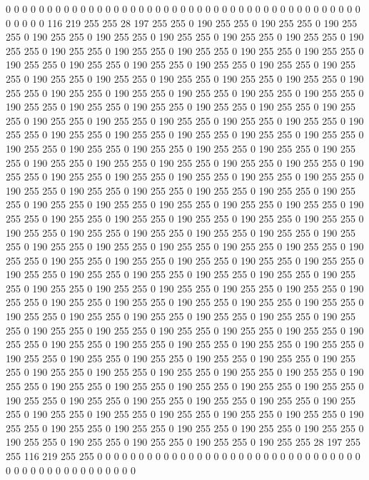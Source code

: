 0 0 0 0 0 0 0 0 0 0 0 0 0 0 0 0 0 0 0 0 0 0 0 0 0 0 0 0 0 0 0 0 0 0 0 0 0 0 0 0 0 0 0 0 0 0 0 0 116 219 255 255 28 197 255 255 0 190 255 255 0 190 255 255 0 190 255 255 0 190 255 255 0 190 255 255 0 190 255 255 0 190 255 255 0 190 255 255 0 190 255 255 0 190 255 255 0 190 255 255 0 190 255 255 0 190 255 255 0 190 255 255 0 190 255 255 0 190 255 255 0 190 255 255 0 190 255 255 0 190 255 255 0 190 255 255 0 190 255 255 0 190 255 255 0 190 255 255 0 190 255 255 0 190 255 255 0 190 255 255 0 190 255 255 0 190 255 255 0 190 255 255 0 190 255 255 0 190 255 255 0 190 255 255 0 190 255 255 0 190 255 255 0 190 255 255 0 190 255 255 
0 190 255 255 0 190 255 255 0 190 255 255 0 190 255 255 0 190 255 255 0 190 255 255 0 190 255 255 0 190 255 255 0 190 255 255 0 190 255 255 0 190 255 255 0 190 255 255 0 190 255 255 0 190 255 255 0 190 255 255 0 190 255 255 0 190 255 255 0 190 255 255 0 190 255 255 0 190 255 255 0 190 255 255 0 190 255 255 0 190 255 255 0 190 255 255 0 190 255 255 0 190 255 255 0 190 255 255 0 190 255 255 0 190 255 255 0 190 255 255 0 190 255 255 0 190 255 255 0 190 255 255 0 190 255 255 0 190 255 255 0 190 255 255 0 190 255 255 0 190 255 255 0 190 255 255 0 190 255 255 0 190 255 255 0 190 255 255 0 190 255 255 0 190 255 255 0 190 255 255 0 190 255 255 0 190 255 255 0 190 255 255 0 190 255 255 0 190 255 255 
0 190 255 255 0 190 255 255 0 190 255 255 0 190 255 255 0 190 255 255 0 190 255 255 0 190 255 255 0 190 255 255 0 190 255 255 0 190 255 255 0 190 255 255 0 190 255 255 0 190 255 255 0 190 255 255 0 190 255 255 0 190 255 255 0 190 255 255 0 190 255 255 0 190 255 255 0 190 255 255 0 190 255 255 0 190 255 255 0 190 255 255 0 190 255 255 0 190 255 255 0 190 255 255 0 190 255 255 0 190 255 255 0 190 255 255 0 190 255 255 0 190 255 255 0 190 255 255 0 190 255 255 0 190 255 255 0 190 255 255 0 190 255 255 0 190 255 255 0 190 255 255 0 190 255 255 0 190 255 255 0 190 255 255 0 190 255 255 0 190 255 255 0 190 255 255 0 190 255 255 0 190 255 255 0 190 255 255 0 190 255 255 0 190 255 255 0 190 255 255 
0 190 255 255 0 190 255 255 0 190 255 255 0 190 255 255 0 190 255 255 0 190 255 255 0 190 255 255 0 190 255 255 0 190 255 255 0 190 255 255 0 190 255 255 0 190 255 255 0 190 255 255 0 190 255 255 0 190 255 255 0 190 255 255 0 190 255 255 0 190 255 255 0 190 255 255 0 190 255 255 0 190 255 255 0 190 255 255 0 190 255 255 0 190 255 255 0 190 255 255 0 190 255 255 0 190 255 255 0 190 255 255 0 190 255 255 0 190 255 255 0 190 255 255 0 190 255 255 0 190 255 255 0 190 255 255 0 190 255 255 0 190 255 255 28 197 255 255 116 219 255 255 0 0 0 0 0 0 0 0 0 0 0 0 0 0 0 0 0 0 0 0 0 0 0 0 0 0 0 0 0 0 0 0 0 0 0 0 0 0 0 0 0 0 0 0 0 0 0 0 
